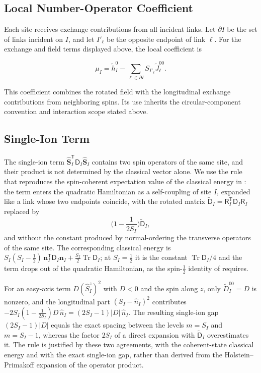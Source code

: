 \subsection{Local Number-Operator Coefficient}

Each site receives exchange contributions from all incident links. Let \(\partial I\) be the set of links incident on \(I\), and let \(I'_\ell\) be the opposite endpoint of link \(\ell\). For the exchange and field terms displayed above, the local coefficient is

\[
\mu_I
=\widetilde h_I^0
-\sum_{\ell\in\partial I}S_{I'_\ell}\widetilde J_\ell^{00}.
\]

This coefficient combines the rotated field with the longitudinal exchange contributions from neighboring spins. Its use inherits the circular-component convention and interaction scope stated above.

\subsection{Single-Ion Term}

The single-ion term \(\hat{\mathbf S}_I^{\mathsf T}\mathsf D_I\hat{\mathbf S}_I\) contains two spin operators of the same site, and their product is not determined by the classical vector alone. We use the rule that reproduces the spin-coherent expectation value of the classical energy in : the term enters the quadratic Hamiltonian as a self-coupling of site \(I\), expanded like a link whose two endpoints coincide, with the rotated matrix \(\widetilde{\mathsf D}_I=\mathsf R_I^{\mathsf T}\mathsf D_I\mathsf R_I\) replaced by
\[
\Big(1-\frac{1}{2S_I}\Big)\widetilde{\mathsf D}_I,
\]
and without the constant produced by normal-ordering the transverse operators of the same site. The corresponding classical energy is \(S_I(S_I-\tfrac12)\,\mathbf n_I^{\mathsf T}\mathsf D_I\mathbf n_I+\tfrac{S_I}{2}\operatorname{Tr}\mathsf D_I\); at \(S_I=\tfrac12\) it is the constant \(\operatorname{Tr}\mathsf D_I/4\) and the term drops out of the quadratic Hamiltonian, as the spin-\(\tfrac12\) identity of  requires.

For an easy-axis term \(D(\hat S_I^z)^2\) with \(D<0\) and the spin along \(z\), only \(\widetilde D_I^{00}=D\) is nonzero, and the longitudinal part \((S_I-\hat n_I)^2\) contributes \(-2S_I(1-\tfrac1{2S_I})D\,\hat n_I=(2S_I-1)|D|\,\hat n_I\). The resulting single-ion gap \((2S_I-1)|D|\) equals the exact spacing between the levels \(m=S_I\) and \(m=S_I-1\), whereas the factor \(2S_I\) of a direct expansion with \(\widetilde{\mathsf D}_I\) overestimates it. The rule is justified by these two agreements, with the coherent-state classical energy and with the exact single-ion gap, rather than derived from the Holstein--Primakoff expansion of the operator product.


